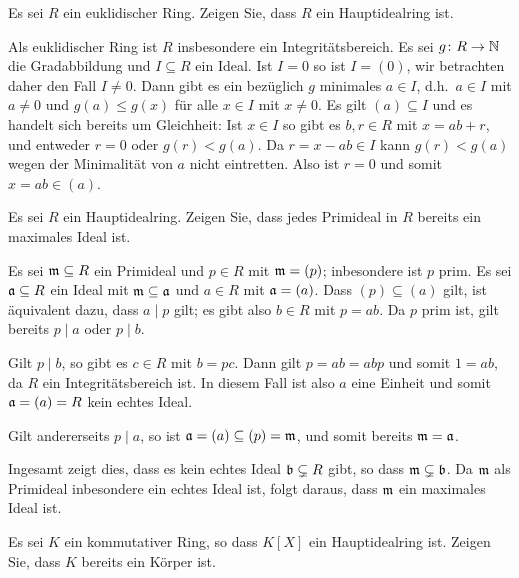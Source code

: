 \begin{question}
  Es sei $R$ ein euklidischer Ring.
  Zeigen Sie, dass $R$ ein Hauptidealring ist.
\end{question}


\begin{solution}
  Als euklidischer Ring ist $R$ insbesondere ein Integritätsbereich.
  Es sei $g \colon R \to \mathbb{N}$ die Gradabbildung und $I \subseteq R$ ein Ideal.
  Ist $I = 0$ so ist $I = (0)$, wir betrachten daher den Fall $I \neq 0$.
  Dann gibt es ein bezüglich $g$ minimales $a \in I$, d.h.\ $a \in I$ mit $a \neq 0$ und $g(a) \leq g(x)$ für alle $x \in I$ mit $x \neq 0$.
  Es gilt $(a) \subseteq I$ und es handelt sich bereits um Gleichheit:
  Ist $x \in I$ so gibt es $b, r \in R$ mit $x = ab + r$, und entweder $r = 0$ oder $g(r) < g(a)$.
  Da $r = x - ab \in I$ kann $g(r) < g(a)$ wegen der Minimalität von $a$ nicht eintretten.
  Also ist $r = 0$ und somit $x = ab \in (a)$.
\end{solution}


\begin{question}
  Es sei $R$ ein Hauptidealring.
  Zeigen Sie, dass jedes Primideal in $R$ bereits ein maximales Ideal ist.
\end{question}


\begin{solution}
  Es sei $\mathfrak{m} \subseteq R$ ein Primideal und $p \in R$ mit $\mathfrak{m} = (p)$;
  inbesondere ist $p$ prim.
  Es sei $\mathfrak{a} \subseteq R$ ein Ideal mit $\mathfrak{m} \subseteq \mathfrak{a}$ und $a \in R$ mit $\mathfrak{a} = (a)$.
  Dass $(p) \subseteq (a)$ gilt, ist äquivalent dazu, dass $a \mid p$ gilt;
  es gibt also $b \in R$ mit $p = ab$.
  Da $p$ prim ist, gilt bereits $p \mid a$ oder $p \mid b$.
  
  Gilt $p \mid b$, so gibt es $c \in R$ mit $b = pc$.
  Dann gilt $p = ab = abp$ und somit $1 = ab$, da $R$ ein Integritätsbereich ist.
  In diesem Fall ist also $a$ eine Einheit und somit $\mathfrak{a} = (a) = R$ kein echtes Ideal.
  
  Gilt andererseits $p \mid a$, so ist $\mathfrak{a} = (a) \subseteq (p) = \mathfrak{m}$, und somit bereits $\mathfrak{m} = \mathfrak{a}$.
  
  Ingesamt zeigt dies, dass es kein echtes Ideal $\mathfrak{b} \subsetneq R$ gibt, so dass $\mathfrak{m} \subsetneq \mathfrak{b}$.
  Da $\mathfrak{m}$ als Primideal inbesondere ein echtes Ideal ist, folgt daraus, dass $\mathfrak{m}$ ein maximales Ideal ist.
\end{solution}


\begin{question}
  \label{question: fields are the only rings for which the polynomial ring is a pid}
  Es sei $K$ ein kommutativer Ring, so dass $K[X]$ ein Hauptidealring ist.
  Zeigen Sie, dass $K$ bereits ein Körper ist.
\end{question}


